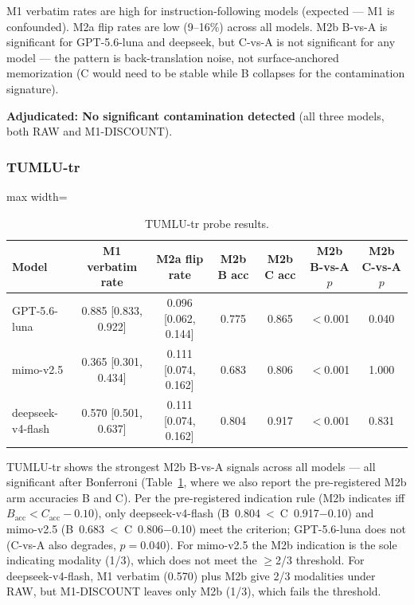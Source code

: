 \documentclass[11pt]{article}
\begin{document}
M1 verbatim rates are high for instruction-following models (expected --- M1 is confounded). M2a flip rates are low (9--16\%) across all models. M2b B-vs-A is significant for GPT-5.6-luna and deepseek, but C-vs-A is not significant for any model --- the pattern is back-translation noise, not surface-anchored memorization (C would need to be stable while B collapses for the contamination signature).

\textbf{Adjudicated: No significant contamination detected} (all three models, both RAW and M1-DISCOUNT).

\subsubsection{TUMLU-tr}

\begin{table}[t]
\centering
\begin{adjustbox}{max width=\textwidth}
\begin{tabular}{lcccccc}
\toprule
\textbf{Model} & \textbf{M1 verbatim rate} & \textbf{M2a flip rate} & \textbf{M2b B acc} & \textbf{M2b C acc} & \textbf{M2b B-vs-A $p$} & \textbf{M2b C-vs-A $p$} \\
\midrule
GPT-5.6-luna & 0.885 [0.833, 0.922] & 0.096 [0.062, 0.144] & 0.775 & 0.865 & $<$0.001 & 0.040 \\
mimo-v2.5 & 0.365 [0.301, 0.434] & 0.111 [0.074, 0.162] & 0.683 & 0.806 & $<$0.001 & 1.000 \\
deepseek-v4-flash & 0.570 [0.501, 0.637] & 0.111 [0.074, 0.162] & 0.804 & 0.917 & $<$0.001 & 0.831 \\
\bottomrule
\end{tabular}%
\end{adjustbox}
\caption{TUMLU-tr probe results.}
\label{tab:tumlu}
\end{table}

TUMLU-tr shows the strongest M2b B-vs-A signals across all models --- all significant after Bonferroni (Table~\ref{tab:tumlu}, where we also report the pre-registered M2b arm accuracies B and C). Per the pre-registered indication rule (M2b indicates iff $B_\text{acc} < C_\text{acc} - 0.10$), only deepseek-v4-flash (B~0.804~<~C~0.917$-$0.10) and mimo-v2.5 (B~0.683~<~C~0.806$-$0.10) meet the criterion; GPT-5.6-luna does not (C-vs-A also degrades, $p{=}0.040$). For mimo-v2.5 the M2b indication is the sole indicating modality (1/3), which does not meet the $\geq$2/3 threshold. For deepseek-v4-flash, M1 verbatim (0.570) plus M2b give 2/3 modalities under RAW, but M1-DISCOUNT leaves only M2b (1/3), which fails the threshold.
\end{document}
